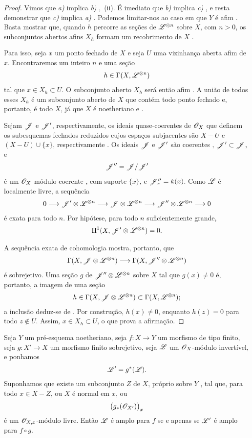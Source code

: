 \begin{proof}
Vimos que \emph{a) } implica \emph{b) } ,~(ii).
É imediato que \emph{b) } implica \emph{c) }, e resta demonstrar
que \emph{c) } implica \emph{a) }.
Podemos limitar-nos ao caso em que $Y$ é afim .
Basta mostrar que, quando $h$ percorre as seções de
$\mathscr{L}^{\otimes n}$ sobre $X$, com $n>0$, os subconjuntos abertos afins $X_h$
formam um recobrimento de $X$ .

Para isso, seja $x$ um ponto fechado de $X$ e seja $U$ uma vizinhança
aberta afim de $x$.
Encontraremos um inteiro $n$ e uma seção
\[
  h\in\Gamma(X,\mathscr{L}^{\otimes n})
\]
tal que $x\in X_h\subset U$.
O subconjunto aberto $X_h$ será então afim .
A união de todos esses $X_h$ é um subconjunto aberto de $X$ que contém todo
ponto fechado e, portanto, é todo $X$, já que $X$ é noetheriano
 e .

Sejam $\mathscr{J}$ e $\mathscr{J}'$, respectivamente, os ideais quase-coerentes de
$\mathscr{O}_X$ que definem os subesquemas fechados reduzidos cujos espaços
subjacentes são $X-U$ e $(X-U)\cup\{x\}$, respectivamente .
Os ideais $\mathscr{J}$ e $\mathscr{J}'$ são coerentes ,
$\mathscr{J}'\subset\mathscr{J}$, e
\[
  \mathscr{J}''=\mathscr{J}/\mathscr{J}'
\]
é um $\mathscr{O}_X$-módulo coerente , com suporte
$\{x\}$, e $\mathscr{J}''_x=k(x)$.
Como $\mathscr{L}$ é localmente livre, a sequência
\[
  0\longrightarrow
  \mathscr{J}'\otimes\mathscr{L}^{\otimes n}
  \longrightarrow
  \mathscr{J}\otimes\mathscr{L}^{\otimes n}
  \longrightarrow
  \mathscr{J}''\otimes\mathscr{L}^{\otimes n}
  \longrightarrow0
\]
é exata para todo $n$.
Por hipótese, para todo $n$ suficientemente grande,
\[
  \mathrm{H}^1(X,\mathscr{J}'\otimes\mathscr{L}^{\otimes n})=0.
\]


A sequência exata de cohomologia mostra, portanto, que
\[
  \Gamma(X,\mathscr{J}\otimes\mathscr{L}^{\otimes n})
  \longrightarrow
  \Gamma(X,\mathscr{J}''\otimes\mathscr{L}^{\otimes n})
\]
é sobrejetivo.
Uma seção $g$ de $\mathscr{J}''\otimes\mathscr{L}^{\otimes n}$ sobre $X$ tal que
$g(x)\neq0$ é, portanto, a imagem de uma seção
\[
  h\in\Gamma(X,\mathscr{J}\otimes\mathscr{L}^{\otimes n})
  \subset\Gamma(X,\mathscr{L}^{\otimes n});
\]
a inclusão deduz-se de .
Por construção, $h(x)\neq0$, enquanto $h(z)=0$ para todo $z\notin U$.
Assim, $x\in X_h\subset U$, o que prova a afirmação.
\end{proof}

\begin{proposition}[2.6.2]
\label{III.2.6.2}
Seja $Y$ um pré-esquema noetheriano, seja $f:X\to Y$ um morfismo de
tipo finito, seja $g:X'\to X$ um morfismo finito sobrejetivo, seja
$\mathscr{L}$ um $\mathscr{O}_X$-módulo invertível, e ponhamos
\[
  \mathscr{L}'=g^*(\mathscr{L}).
\]
Suponhamos que existe um subconjunto $Z$ de $X$, próprio sobre $Y$
, tal que, para todo $x\in X-Z$, ou $X$ é
normal em $x$, ou
\[
  \bigl(g_*(\mathscr{O}_{X'})\bigr)_x
\]
é um $\mathscr{O}_{X,x}$-módulo livre.
Então $\mathscr{L}$ é amplo para $f$ se e apenas se $\mathscr{L}'$ é amplo para
$f\circ g$.
\end{proposition}

